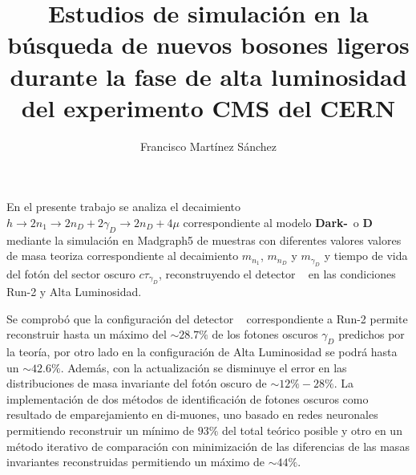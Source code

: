 \documentclass[12pt]{report}
\begin{document}
\title{Estudios de simulación en la búsqueda de nuevos bosones ligeros durante la fase de alta luminosidad del experimento CMS del CERN}
\author{Francisco Martínez Sánchez}
\maketitle
%

\begin{resumen}\thispagestyle{empty}
En el presente trabajo se analiza el decaimiento $h \rightarrow 2n_1 \rightarrow 2n_D + 2\gamma_D \rightarrow 2n_D + 4\mu$ correspondiente al modelo \textbf{Dark-}\SUSY ~o \MSSM\textbf{D}~ mediante la simulación en \textsf{Madgraph5} de muestras con diferentes valores valores de masa teoriza correspondiente al decaimiento $m_{n_1}$, $m_{n_D}$ y $m_{\gamma_D}$ y tiempo de vida del fotón del sector oscuro $c\tau_{\gamma_D}$, reconstruyendo el detector \CMS~ en las condiciones Run-2 y Alta Luminosidad. 


Se comprobó que la configuración del detector \CMS~ correspondiente a Run-2 permite reconstruir hasta un máximo del $\sim 28.7\%$ de los fotones oscuros $\gamma_D$ predichos por la teoría, por otro lado en la configuración de Alta Luminosidad se podrá hasta un $\sim 42.6\%$. Además, con la actualización se disminuye el error en las distribuciones de masa invariante del fotón oscuro de $\sim 12\% - 28\%$. La implementación de dos métodos de identificación de fotones oscuros como resultado de emparejamiento en di-muones, uno basado en redes neuronales permitiendo reconstruir un mínimo de $93\%$ del total teórico posible y otro en un método iterativo de comparación con minimización de las diferencias de las masas invariantes reconstruidas permitiendo un máximo de $\sim 44\%$.





\end{resumen}
\end{document}
